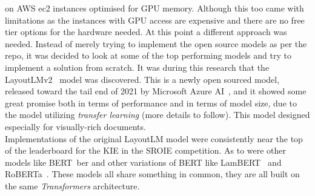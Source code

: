 on AWS ec2 instances optimised for GPU memory. Although this too came with limitations as the instances with GPU access are expensive and there are no
free tier options for the hardware needed. At this point a different approach was needed.
\bigbreak
Instead of merely trying to implement the open source models as per the repo, it was decided to look at some of the top performing models and try to implement
a solution from scratch. It was during this research that the LayoutLMv2~\autocite{xuLayoutLMv2MultimodalPretraining2022} model was discovered. This is a newly open
sourced model, released toward the tail end of 2021 by Microsoft Azure AI~\autocite{ArtificialIntelligenceResearch}, and it showed some great promise both in
terms of performance and in terms of model size, due to the model utilizing \emph{transfer learning} (more details to follow). This model designed especially
for visually-rich documents.\\
Implementations of the original LayoutLM model were consistently near the top of the leaderboard for the KIE in the SROIE competition. As to were
other models like BERT~ber\autocite{BERT} and other variations of BERT like LamBERT~\autocite{LAMBERT2022} and RoBERTa~\autocite{RoBERTa}. These models all share something in common, they are all built on the same
\emph{Transformers} architecture.
\bigbreak
